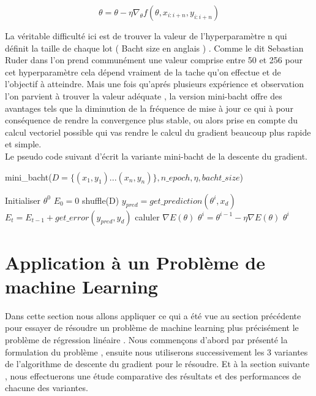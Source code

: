 \documentclass[12pt,a4paper]{article}
\begin{document}
\begin{large}
\begin{equation}
\theta = \theta - \eta \nabla_{\theta}f(\theta, x_{i:i+n}, y_{i:i+n})
\end{equation}
\end{large}

La véritable difficulté ici est de trouver la valeur de l'hyperparamètre n qui définit la taille de chaque lot ( Bacht size en anglais ) . Comme le dit Sebastian Ruder dans \cite{ref1} l'on prend communément une valeur comprise entre 50 et 256 pour cet hyperparamètre cela dépend vraiment de la tache qu'on effectue et de l'objectif à atteindre. Mais une fois qu'aprés plusieurs expérience et observation l'on parvient à trouver la valeur adéquate , la version mini-bacht offre des avantages tels que la diminution de la fréquence de mise à jour ce qui à pour conséquence de rendre la convergence plus stable, ou alors prise en compte du calcul vectoriel possible qui vas rendre le calcul du gradient beaucoup plus rapide et simple.\\ 
Le pseudo code suivant d'écrit la variante mini-bacht de la descente du gradient.

\begin{center}
\begin{algorithm}[H]
\caption{mini\_bacht($ D = \lbrace (x_{1},y_{1})...(x_{n},y_{n}) \rbrace, n\_epoch, \eta, bacht\_size$)}
\begin{algorithmic} 
\STATE Initialiser $\theta^{0}$
\STATE $E_{0} = 0$
\STATE shuffle(D)
\STATE $y_{pred} = get\_prediction(\theta^{i}, x_{d})$
\STATE $E_{t} = E_{t-1} + get\_error(y_{pred}, y_{d})$
\STATE caluler $\nabla E(\theta )$
\STATE $\theta^{i} = \theta^{i-1} - \eta\nabla E(\theta ) $
\ENDFOR
\ENDFOR
\ENDFOR
\RETURN $\theta^{i}$
\end{algorithmic}
\end{algorithm}
\end{center}


\section{Application à un Problème de machine Learning}

Dans cette section nous allons appliquer ce qui a été vue au section précédente pour essayer de résoudre un problème de machine learning plus précisément le problème de régression linéaire . Nous commençons d'abord par présenté la formulation du problème , ensuite nous utiliserons successivement les 3 variantes de l'algorithme de descente du gradient pour le résoudre. Et à la section suivante , nous effectuerons une étude comparative des résultats et des performances de chacune des variantes.
\end{document}

